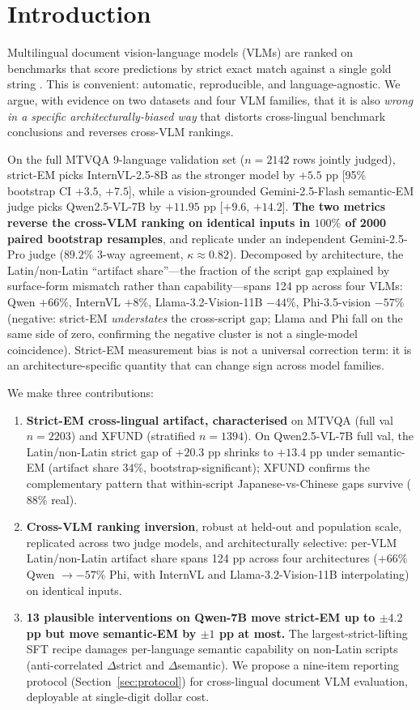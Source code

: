 \section{Introduction}

Multilingual document vision-language models (VLMs) are ranked on benchmarks that score predictions by strict exact match against a single gold string \citep{tang2024mtvqa, xu2022xfund}. This is convenient: automatic, reproducible, and language-agnostic. We argue, with evidence on two datasets and four VLM families, that it is also \emph{wrong in a specific architecturally-biased way} that distorts cross-lingual benchmark conclusions and reverses cross-VLM rankings.

On the full MTVQA 9-language validation set ($n=2142$ rows jointly judged), strict-EM picks InternVL-2.5-8B as the stronger model by $+5.5$ pp [95\% bootstrap CI $+3.5$, $+7.5$], while a vision-grounded Gemini-2.5-Flash semantic-EM judge picks Qwen2.5-VL-7B by $+11.95$ pp [$+9.6$, $+14.2$]. \textbf{The two metrics reverse the cross-VLM ranking on identical inputs in $100\%$ of 2000 paired bootstrap resamples}, and replicate under an independent Gemini-2.5-Pro judge ($89.2\%$ 3-way agreement, $\kappa \approx 0.82$). Decomposed by architecture, the Latin/non-Latin ``artifact share''---the fraction of the script gap explained by surface-form mismatch rather than capability---spans 124 pp across four VLMs: Qwen $+66\%$, InternVL $+8\%$, Llama-3.2-Vision-11B $-44\%$, Phi-3.5-vision $-57\%$ (negative: strict-EM \emph{understates} the cross-script gap; Llama and Phi fall on the same side of zero, confirming the negative cluster is not a single-model coincidence). Strict-EM measurement bias is not a universal correction term: it is an architecture-specific quantity that can change sign across model families.

We make three contributions:

\begin{enumerate}
\setlength\itemsep{0pt}
\item \textbf{Strict-EM cross-lingual artifact, characterised} on MTVQA (full val $n=2203$) and XFUND (stratified $n=1394$). On Qwen2.5-VL-7B full val, the Latin/non-Latin strict gap of $+20.3$ pp shrinks to $+13.4$ pp under semantic-EM (artifact share $34\%$, bootstrap-significant); XFUND confirms the complementary pattern that within-script Japanese-vs-Chinese gaps survive ($88\%$ real).
\item \textbf{Cross-VLM ranking inversion}, robust at held-out and population scale, replicated across two judge models, and architecturally selective: per-VLM Latin/non-Latin artifact share spans 124 pp across four architectures ($+66\%$ Qwen $\to -57\%$ Phi, with InternVL and Llama-3.2-Vision-11B interpolating) on identical inputs.
\item \textbf{13 plausible interventions on Qwen-7B move strict-EM up to $\pm 4.2$ pp but move semantic-EM by $\pm 1$ pp at most.} The largest-strict-lifting SFT recipe damages per-language semantic capability on non-Latin scripts (anti-correlated $\Delta$strict and $\Delta$semantic). We propose a nine-item reporting protocol (Section~\ref{sec:protocol}) for cross-lingual document VLM evaluation, deployable at single-digit dollar cost.
\end{enumerate}

